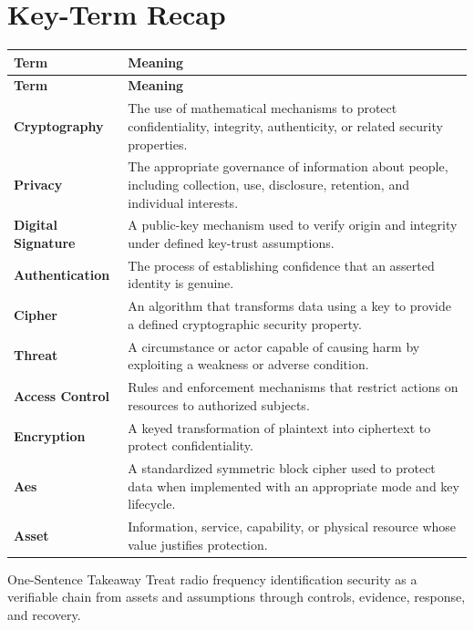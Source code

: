 \documentclass[11pt,letterpaper]{article}
\begin{document}
\section*{Key-Term Recap}
\begin{longtable}{>{\raggedright\arraybackslash}p{}>{\raggedright\arraybackslash}p{}}
\toprule\rowcolor{Navy}\color{white}\textbf{Term} & \color{white}\textbf{Meaning}\\\midrule
\endfirsthead
\toprule\rowcolor{Navy}\color{white}\textbf{Term} & \color{white}\textbf{Meaning}\\\midrule
\endhead
\textbf{Cryptography} & The use of mathematical mechanisms to protect confidentiality, integrity, authenticity, or related security properties. \\\midrule
\textbf{Privacy} & The appropriate governance of information about people, including collection, use, disclosure, retention, and individual interests. \\\midrule
\textbf{Digital Signature} & A public-key mechanism used to verify origin and integrity under defined key-trust assumptions. \\\midrule
\textbf{Authentication} & The process of establishing confidence that an asserted identity is genuine. \\\midrule
\textbf{Cipher} & An algorithm that transforms data using a key to provide a defined cryptographic security property. \\\midrule
\textbf{Threat} & A circumstance or actor capable of causing harm by exploiting a weakness or adverse condition. \\\midrule
\textbf{Access Control} & Rules and enforcement mechanisms that restrict actions on resources to authorized subjects. \\\midrule
\textbf{Encryption} & A keyed transformation of plaintext into ciphertext to protect confidentiality. \\\midrule
\textbf{Aes} & A standardized symmetric block cipher used to protect data when implemented with an appropriate mode and key lifecycle. \\\midrule
\textbf{Asset} & Information, service, capability, or physical resource whose value justifies protection. \\\midrule
\bottomrule
\end{longtable}
\begin{CornellExamBox}{One-Sentence Takeaway}
Treat radio frequency identification security as a verifiable chain from assets and assumptions through controls, evidence, response, and recovery.
\end{CornellExamBox}
\end{document}
